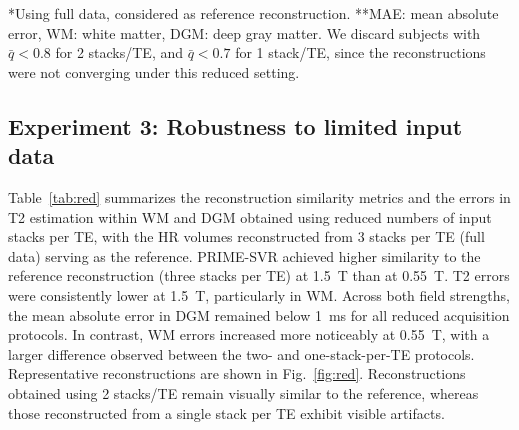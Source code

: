 \documentclass[preprint,authoryear,12pt]{elsarticle}
\begin{document}
\begin{table}[tbp]
\centering
\caption{Comparison of the reconstruction quality when using less than 3 stacks per TE for PRIME-SVR.}
\vspace{-.2cm}
\vspace{-.3cm}
\begin{flushleft}
\footnotesize{*Using full data, considered as reference reconstruction. **MAE: mean absolute error, WM: white matter, DGM: deep gray matter.}
\footnotesize{We discard subjects with $\bar{q} < 0.8$ for 2 stacks/TE, and $\bar{q} < 0.7$ for 1 stack/TE, since the reconstructions were not converging under this reduced setting.}
\end{flushleft}
\vspace{-.5cm}
\label{tab:red}
\end{table}

\subsection{Experiment 3: Robustness to limited input data}
\label{exp:exp3}
 Table~\ref{tab:red} summarizes the reconstruction similarity metrics and the errors in T2 estimation within WM and DGM obtained using reduced numbers of input stacks per TE, with the HR volumes reconstructed from 3 stacks per TE (full data) serving as the reference. PRIME-SVR achieved higher similarity to the reference reconstruction (three stacks per TE) at 1.5~T than at 0.55~T. T2 errors were consistently lower at 1.5~T, particularly in WM. Across both field strengths, the mean absolute error in DGM remained below 1~ms for all reduced acquisition protocols. In contrast, WM errors increased more noticeably at 0.55~T, with a larger difference observed between the two- and one-stack-per-TE protocols. Representative reconstructions are shown in Fig.~\ref{fig:red}. 
Reconstructions obtained using 2 stacks/TE remain visually similar to the reference, whereas those reconstructed from a single stack per TE exhibit visible artifacts.
\end{document}

